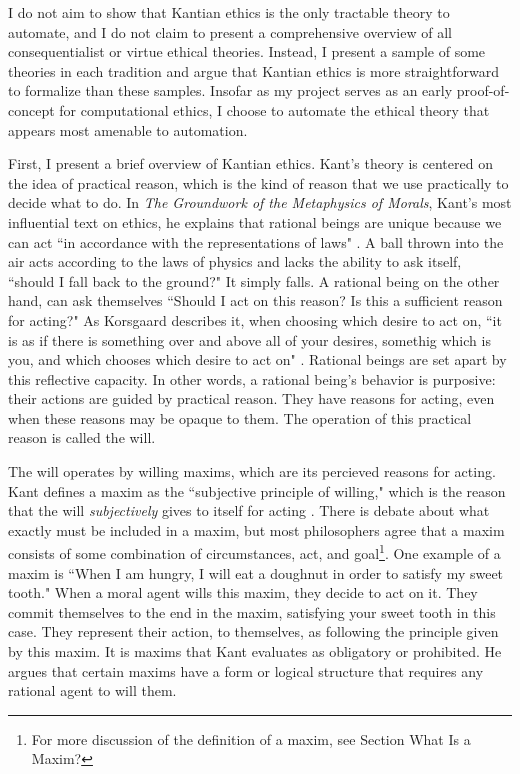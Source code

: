 \begin{isabellebody}
\begin{isamarkuptext}
I do not aim to show that Kantian ethics is the only tractable theory to automate, and I do not claim to present a comprehensive
overview of all consequentialist or virtue ethical theories. Instead, I present a sample of some theories
in each tradition and argue that Kantian ethics is more straightforward to formalize than these samples.
Insofar as my project serves as an early proof-of-concept for computational ethics, I choose to automate
the ethical theory that appears most amenable to automation.%
\end{isamarkuptext}\isamarkuptrue%
%
\isadelimdocument
%
\endisadelimdocument
%
\isatagdocument
%
\isamarkuptrue%
%
\endisatagdocument
{\isafolddocument}%
%
\isadelimdocument
%
\endisadelimdocument
%
\begin{isamarkuptext}%
First, I present a brief overview of Kantian ethics. Kant's theory is centered on the idea of 
practical reason, which is the kind of reason that we use practically to decide what to do. In \emph{The 
Groundwork of the Metaphysics of Morals}, Kant's most influential text on ethics, he explains that 
rational beings are unique because we can act ``in accordance with the representations of laws" \cite[4:412]{groundwork}.
A ball thrown into the air acts according to the laws of physics and lacks the ability to ask itself, 
``should I fall back to the ground?" It simply falls. A rational being on the other hand, can ask themselves
``Should I act on this reason? Is this a sufficient reason for acting?" As Korsgaard describes it, when 
choosing which desire to act on, ``it is as if there is something over and above all of your desires, 
somethig which is you, and which chooses which desire to act on" \cite[100]{sources}. Rational beings are
set apart by this reflective capacity. In other words, a rational being's behavior is purposive: their 
actions are guided by practical reason. They have reasons for acting, even when these reasons may be 
opaque to them. The operation of this practical reason is called the will. 

The will operates by willing maxims, which are its percieved reasons for acting. Kant defines a maxim as 
the ``subjective principle of willing," which is the reason that the will \emph{subjectively} gives 
to itself for acting \cite[16, footnote 1]{groundwork}. There is debate about what exactly must be 
included in a maxim, but most philosophers agree that a maxim consists of some combination of circumstances, 
act, and goal\footnote{For more discussion of the definition of a maxim, see Section What Is a Maxim?}.
One example of a maxim is ``When I am hungry, I will eat a doughnut in order to satisfy my sweet tooth." 
When a moral agent wills this maxim, they decide to act on it. They commit themselves to the end in the maxim, 
satisfying your sweet tooth in this case. They represent their action, to themselves, as following the 
principle given by this maxim. It is maxims that Kant evaluates as obligatory or prohibited. He argues that
certain maxims have a form or logical structure that requires any rational agent to will them. 


\end{isamarkuptext}
\end{isabellebody}
